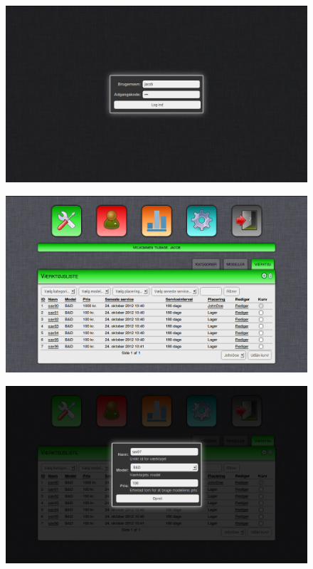 \documentclass{article}
\begin{document}
\begin{figure}[htbp]
\includegraphics[scale=0.40]{./figures/loginpage.png}
\end{figure}

\begin{figure}[htbp]
\includegraphics[scale=0.40]{./figures/tools.png}
\end{figure}

\begin{figure}[htbp]
\includegraphics[scale=0.40]{./figures/createtool.png}
\end{figure}
\end{document}
